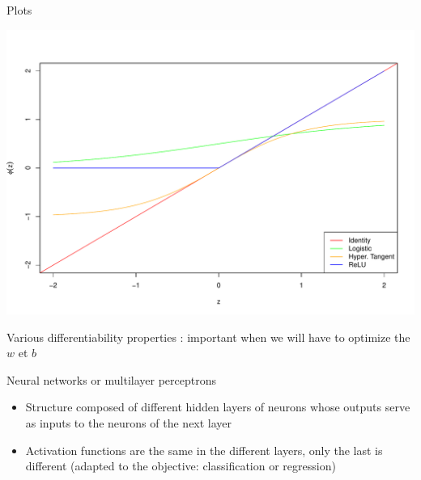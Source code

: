 \documentclass[ignorenonframetext,]{beamer}
\providecommand{\tightlist}{%
  \setlength{\itemsep}{0pt}\setlength{\parskip}{0pt}}
\begin{document}
\begin{frame}{Plots}
\protect\hypertarget{plots}{}

\includegraphics{cours_deeplearning_for_dummies_files/figure-beamer/unnamed-chunk-1-1.pdf}

Various differentiability properties : important when we will have to
optimize the \(w\) et \(b\)

\end{frame}

\begin{frame}{Neural networks or multilayer perceptrons}
\protect\hypertarget{neural-networks-or-multilayer-perceptrons}{}

\begin{itemize}
\tightlist
\item
  Structure composed of different hidden layers of neurons whose outputs
  serve as inputs to the neurons of the next layer
\item
  Activation functions are the same in the different layers, only the
  last is different (adapted to the objective: classification or
  regression)
\end{itemize}

\end{frame}
\end{document}
